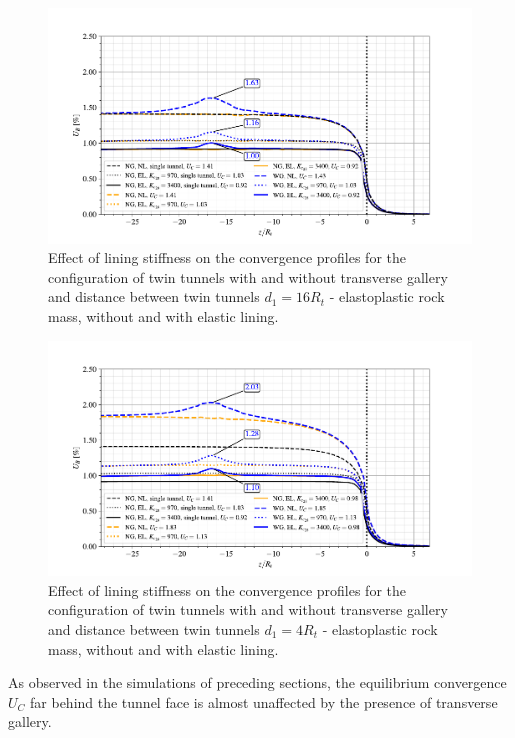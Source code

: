 \documentclass[Journal,letterpaper, NoLists,SectionNumbers]{ascelike-new}
\begin{document}
\begin{figure}[h!]
	\centering
	\includegraphics[scale=0.9]{Convergence Profiles - EP_d1_16Ri_anotate.pdf}
	\caption{Effect of lining stiffness on the convergence profiles for the configuration of twin tunnels with and without transverse gallery and distance between twin tunnels $d_1=16R_t$ - elastoplastic rock mass, without and with elastic lining.}
	\label{EP_d1_16Ri}
\end{figure}

\begin{figure}[h!]
	\centering
	\includegraphics[scale=0.9]{Convergence Profiles - EP_d1_4Ri_anotate.pdf}
	\caption{Effect of lining stiffness on the convergence profiles for the configuration of twin tunnels with and without transverse gallery and distance between twin tunnels $d_1=4R_t$ - elastoplastic rock mass, without and with elastic lining.}
	\label{EP_d1_4Ri}
\end{figure}

As observed in the simulations of preceding sections, the equilibrium convergence $U_C$ far behind the tunnel face is almost unaffected by the presence of transverse gallery. 
\end{document}
